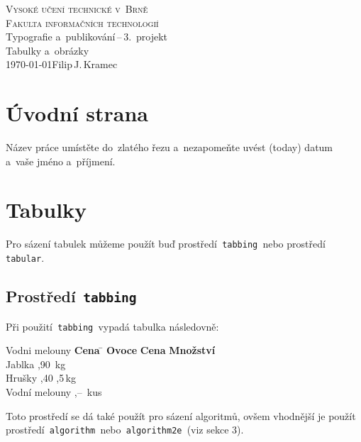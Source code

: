 \documentclass[a4paper, 11pt]{article}
\begin{document}
\begin{titlepage}
	\begin{center}
		{\Huge \textsc{Vysoké učení technické v~Brně}\\}
		{\huge \textsc{Fakulta informačních technologií}\\}
		{\LARGE Typografie a~publikování\,--\,3.\ projekt\\}
		{\Huge Tabulky a~obrázky\\}
		{\Large \today \hfill Filip\,J.\,Kramec}
	\end{center}
\end{titlepage}

\section{Úvodní strana}

Název práce umístěte do~zlatého řezu a~nezapomeňte uvést  (today)
datum a~vaše jméno a~příjmení.

\section{Tabulky}

Pro sázení tabulek můžeme použít buď prostředí\texttt{ tabbing }nebo
prostředí\texttt{ tabular}.

\subsection{Prostředí\texttt{ tabbing}}

Při použití\texttt{ tabbing }vypadá tabulka následovně:
%
\begin{tabbing}
	Vodni melouny \quad  \= \textbf{Cena} \quad \=                \kill
	\textbf{Ovoce}       \> \textbf{Cena}       \> \textbf{Množství} \\
	Jablka               ,90               \,kg             \\
	Hrušky               ,40               ,5\,kg           \\
	Vodní melouny        ,--               \,kus            \\
\end{tabbing}

\noindent
Toto prostředí se dá také použít pro sázení algoritmů, ovšem vhodnější je
použít prostředí\texttt{ algorithm }nebo\texttt{ algorithm2e }(viz sekce
3).
\end{document}
